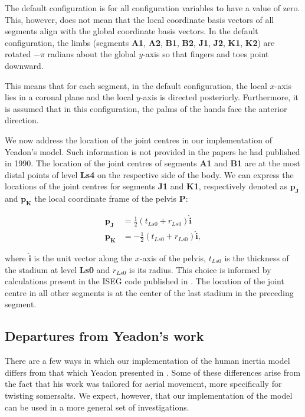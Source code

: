 \documentclass[10pt]{article}
\begin{document}
The default configuration is for all configuration variables to have a value of
zero. This, however, does not mean that the local coordinate basis vectors of
all segments align with the global coordinate basis vectors. In the default
configuration, the limbs (segments \textbf{A1}, \textbf{A2}, \textbf{B1},
\textbf{B2}, \textbf{J1}, \textbf{J2}, \textbf{K1}, \textbf{K2}) are rotated
$-\pi$ radians about the global $y$-axis
so that fingers and toes point downward.

This means that for each segment, in the default configuration, the local
$x$-axis lies in a coronal plane and the local $y$-axis is directed
posteriorly. Furthermore, it is assumed that in this configuration, the palms
of the hands face the anterior direction.

We now address the location of the joint centres in our implementation of
Yeadon's model. Such information is not provided in the papers he had published
in 1990. The location of the joint centres of segments \textbf{A1} and
\textbf{B1} are at the most distal points of level \textbf{Ls4} on the
respective side of the body. We can express the locations of the joint centres
for segments \textbf{J1} and \textbf{K1}, respectively denoted as
$\mathbf{p_J}$ and $\mathbf{p_K}$ the local coordinate frame of the pelvis
\textbf{P}:

\begin{align}
    \mathbf{p_J} &= \frac{1}{2} (t_{Ls0} + r_{Ls0})\mathbf{\hat{i}} \\
    \mathbf{p_K} &= -\frac{1}{2} (t_{Ls0} + r_{Ls0})\mathbf{\hat{i}},
\end{align}

where $\mathbf{\hat{i}}$ is the unit vector along the $x$-axis of the pelvis,
$t_{Ls0}$ is the thickness of the stadium at level \textbf{Ls0} and $r_{Ls0}$
is its radius. This choice is informed by calculations present in the ISEG code
published in \cite{Yeadon1984a}. The location of the joint centre in all other
segments is at the center of the last stadium in the preceding segment.

\subsection*{Departures from Yeadon's work}

There are a few ways in which our implementation of the human inertia model
differs from that which Yeadon presented in \cite{Yeadon1990c, Yeadon1990f,
Yeadon1990e, Yeadon1990d}. Some of these differences arise from the fact that
his work was tailored for aerial movement, more specifically for twisting
somersalts. We expect, however, that our implementation of the model can be
used in a more general set of investigations.
\end{document}
